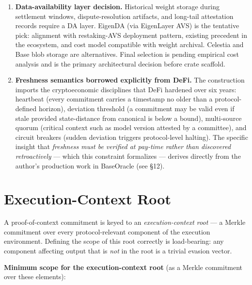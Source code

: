 \documentclass[11pt]{article}
\begin{document}
\begin{enumerate}
\item \textbf{Data-availability layer decision.} Historical weight storage during settlement windows, dispute-resolution artifacts, and long-tail attestation records require a DA layer. EigenDA (via EigenLayer AVS) is the tentative pick: alignment with restaking-AVS deployment pattern, existing precedent in the ecosystem, and cost model compatible with weight archival. Celestia and Base blob storage are alternatives. Final selection is pending empirical cost analysis and is the primary architectural decision before crate scaffold.

\item \textbf{Freshness semantics borrowed explicitly from DeFi.} The construction imports the cryptoeconomic disciplines that DeFi hardened over six years: heartbeat (every commitment carries a timestamp no older than a protocol-defined horizon), deviation threshold (a commitment may be valid even if stale provided state-distance from canonical is below a bound), multi-source quorum (critical context such as model version attested by a committee), and circuit breakers (sudden deviation triggers protocol-level halting). The specific insight that \emph{freshness must be verified at pay-time rather than discovered retroactively} --- which this constraint formalizes --- derives directly from the author's production work in BaseOracle (see \S12).
\end{enumerate}

\section{Execution-Context Root}

A proof-of-context commitment is keyed to an \emph{execution-context root} --- a Merkle commitment over every protocol-relevant component of the execution environment. Defining the scope of this root correctly is load-bearing: any component affecting output that is \emph{not} in the root is a trivial evasion vector.

\textbf{Minimum scope for the execution-context root} (as a Merkle commitment over these elements):
\end{document}
